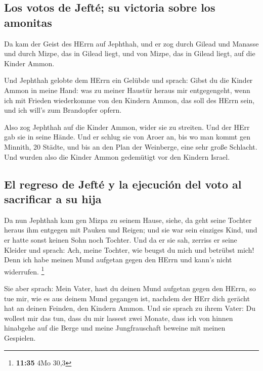 \hypertarget{los-votos-de-jeftuxe9-su-victoria-sobre-los-amonitas}{%
\subsection{Los votos de Jefté; su victoria sobre los
amonitas}\label{los-votos-de-jeftuxe9-su-victoria-sobre-los-amonitas}}

 Da kam der Geist des HErrn auf Jephthah, und er zog
durch Gilead und Manasse und durch Mizpe, das in Gilead liegt, und von
Mizpe, das in Gilead liegt, auf die Kinder Ammon.

 Und Jephthah gelobte dem HErrn ein Gelübde und sprach:
Gibst du die Kinder Ammon in meine Hand:  was zu meiner
Haustür heraus mir entgegengeht, wenn ich mit Frieden wiederkomme von
den Kindern Ammon, das soll des HErrn sein, und ich will's zum
Brandopfer opfern.

 Also zog Jephthah auf die Kinder Ammon, wider sie zu
streiten. Und der HErr gab sie in seine Hände.  Und er
schlug sie von Aroer an, bis wo man kommt gen Minnith, 20 Städte, und
bis an den Plan der Weinberge, eine sehr große Schlacht. Und wurden also
die Kinder Ammon gedemütigt vor den Kindern Israel.

\hypertarget{el-regreso-de-jeftuxe9-y-la-ejecuciuxf3n-del-voto-al-sacrificar-a-su-hija}{%
\subsection{El regreso de Jefté y la ejecución del voto al sacrificar a
su
hija}\label{el-regreso-de-jeftuxe9-y-la-ejecuciuxf3n-del-voto-al-sacrificar-a-su-hija}}

 Da nun Jephthah kam gen Mizpa zu seinem Hause, siehe, da
geht seine Tochter heraus ihm entgegen mit Pauken und Reigen; und sie
war sein einziges Kind, und er hatte sonst keinen Sohn noch Tochter.
 Und da er sie sah, zerriss er seine Kleider und sprach:
Ach, meine Tochter, wie beugst du mich und betrübst mich! Denn ich habe
meinen Mund aufgetan gegen den HErrn und kann's nicht widerrufen.
\footnote{\textbf{11:35} 4Mo 30,3}

 Sie aber sprach: Mein Vater, hast du deinen Mund
aufgetan gegen den HErrn, so tue mir, wie es aus deinem Mund gegangen
ist, nachdem der HErr dich gerächt hat an deinen Feinden, den Kindern
Ammon.  Und sie sprach zu ihrem Vater: Du wollest mir das
tun, dass du mir lassest zwei Monate, dass ich von hinnen hinabgehe auf
die Berge und meine Jungfrauschaft beweine mit meinen Gespielen.


